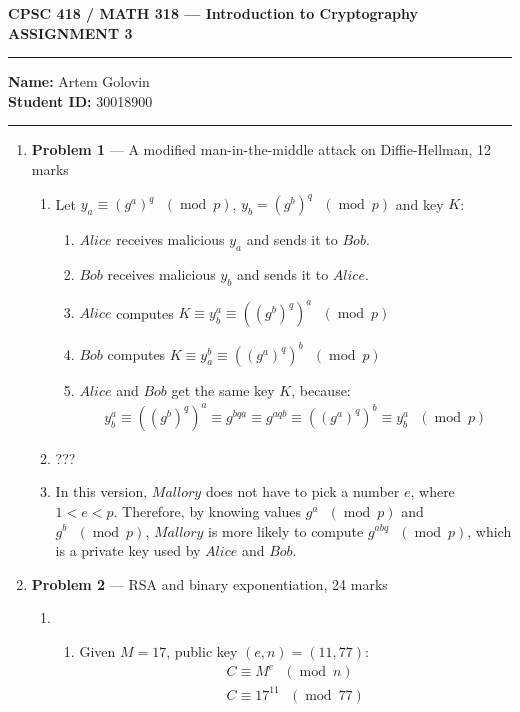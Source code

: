 \documentclass[11pt]{article}
\theoremstyle{definition}
\renewcommand{\pmod}[1]{\mbox{\ $(\ensuremath{\operatorname{mod}}\ {#1})$}}
\newcommand{\A}{Alice}
\newcommand{\B}{Bob}
\newcommand{\M}{Mallory}
\begin{document}
\begin{center}
  \bf \Large CPSC 418 / MATH 318 --- Introduction to Cryptography \\
  ASSIGNMENT 3
\end{center}

\medskip \hrule
  \textbf{Name:} Artem Golovin \\
  \textbf{Student ID:} 30018900
\medskip \hrule


\begin{enumerate} \itemsep 0.3in

\item[] \textbf{Problem 1} --- A modified man-in-the-middle attack on Diffie-Hellman, 12 marks

\begin{enumerate}
  \item
    Let $y_a \equiv (g^a)^q \pmod{p}$, $y_b = (g^b)^q \pmod{p}$ and key $K$:
    \begin{enumerate}
      \item $\A$ receives malicious $y_a$ and sends it to $\B$.
      \item $\B$ receives malicious $y_b$ and sends it to $\A$.
      \item $\A$ computes $K \equiv y_b^a \equiv ((g^b)^q)^a \pmod{p}$
      \item $\B$ computes $K \equiv y_a^b \equiv ((g^a)^q)^b \pmod{p}$
      \item $\A$ and $\B$ get the same key $K$, because:
        \begin{align*}
          y_b^a \equiv ((g^b)^q)^a \equiv g^{bqa} \equiv g^{aqb} \equiv ((g^a)^q)^b \equiv y_b^a \pmod{p}
        \end{align*}
    \end{enumerate}
  \item ???
  \item 
    In this version, $\M$ does not have to pick a number $e$, where $1 < e < p$. Therefore, by knowing values $g^a \pmod{p}$ and $g^b \pmod{p}$, $\M$ is more likely to compute $g^{abq} \pmod{p}$, which is a private key used by $\A$ and $\B$.
\end{enumerate}

\newpage

\item[] \textbf{Problem 2} --- RSA and binary exponentiation, 24 marks

\begin{enumerate}
  \item
    \begin{enumerate}
      \item 
        Given $M = 17$, public key $(e, n) = (11, 77)$:
        \begin{align*}
          C \equiv M^e \pmod{n} \\
          C \equiv 17^{11} \pmod{77}
        \end{align*}


\end{enumerate}
\end{enumerate}
\end{enumerate}
\end{document}
